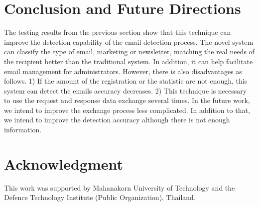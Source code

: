 \documentclass[conference]{IEEEtran}
\begin{document}
\section{Conclusion and Future Directions}
The testing results from the previous section show that this technique can improve the detection capability of the email detection process.
The novel system can classify the type of email, marketing or newsletter, matching the real needs of the recipient better than the traditional system.
In addition, it can help facilitate email management for administrators.
However, there is also disadvantages as follows. 
1) If the amount of the registration or the statistic are not enough,  this system can detect the emails accuracy decreases.
2) This technique is necessary to use the request and response data exchange several times.
In the future work, we intend to improve the exchange process less complicated.
In addition to that, we intend to improve the detection accuracy although there is not enough information.






\section*{Acknowledgment}
This work was supported by Mahanakorn University of Technology and the Defence Technology Institute (Public Organization), Thailand.







%
%
%






\ %




\end{document}
